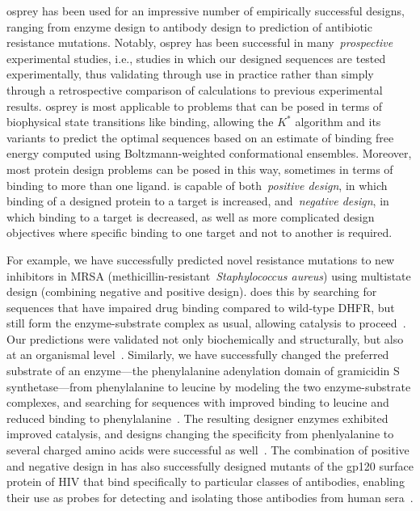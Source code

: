 {\sc osprey} has been used for an impressive number of empirically successful designs, ranging from enzyme design to antibody design to prediction of antibiotic resistance mutations.  Notably, {\sc osprey} has been successful in many~\textit{prospective} experimental studies, i.e., studies in which our designed sequences are tested experimentally, thus validating \osprey through use in practice rather than simply through a retrospective comparison of \osprey calculations to previous experimental results.  {\sc osprey} is most applicable to problems that can be posed in terms of biophysical state transitions like binding, allowing the $K^*$ algorithm and its variants to predict the optimal sequences based on an estimate of binding free energy computed using Boltzmann-weighted conformational ensembles.  Moreover, most protein design problems can be posed in this way, sometimes in terms of binding to more than one ligand.  \osprey is capable of both~\textit{positive design}, in which binding of a designed protein to a target is increased, and~\textit{negative design}, in which binding to a target is decreased, as well as more complicated design objectives where specific binding to one target and not to another is required.  

For example, we have successfully predicted novel resistance mutations to new inhibitors in MRSA (methicillin-resistant~\textit{Staphylococcus aureus}) using multistate design (combining negative and positive design).  \osprey does this by searching for sequences that have impaired drug binding compared to wild-type DHFR, but still form the enzyme-substrate complex as usual, allowing catalysis to proceed~\cite{DHFR-PNAS,DHFR-PNAS2}.  Our predictions were validated not only biochemically and structurally, but also at an organismal level~\cite{DHFR-PNAS2, mimb_resistance, DHFR_hospitals}.  Similarly, we have successfully changed the preferred substrate of an enzyme---the phenylalanine adenylation domain of gramicidin S synthetase---from phenylalanine to leucine by modeling the two enzyme-substrate complexes, and searching for sequences with improved binding to leucine and reduced binding to phenylalanine~\cite{GrsA-LeuA}.  The resulting designer enzymes exhibited improved catalysis, and designs changing the specificity from phenlyalanine to several charged amino acids were successful as well~\cite{GrsA-LeuA}.  The combination of positive and negative design in \osprey has also successfully designed mutants of the gp120 surface protein of HIV that bind specifically to particular classes of antibodies, enabling their use as probes for detecting and isolating those antibodies from human sera~\cite{specific_probes}.  

